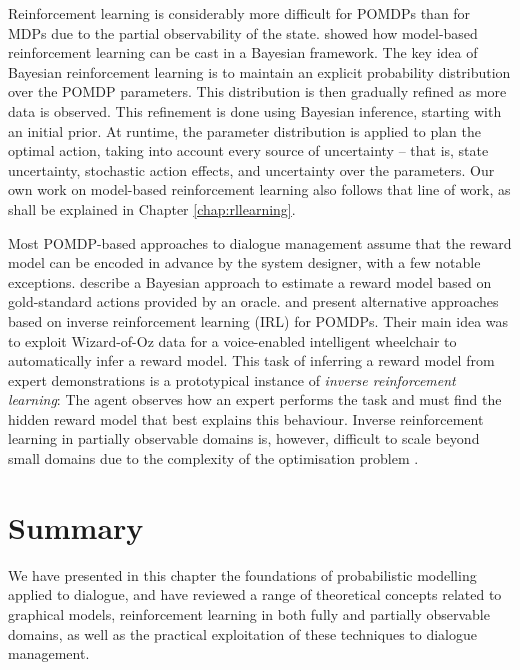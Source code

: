Reinforcement learning is considerably more difficult for POMDPs than for MDPs due to the partial observability of the state.  \cite{5946754} showed how model-based reinforcement learning can be cast in a Bayesian framework. The key idea of Bayesian reinforcement learning is to maintain an explicit probability distribution over the POMDP parameters. This distribution is then gradually refined as more data is observed. This refinement is done using Bayesian inference, starting with an initial prior.  At runtime, the parameter distribution is applied to plan the optimal action, taking into account every source of uncertainty -- that is, state uncertainty, stochastic action effects, and uncertainty over the parameters.  Our own work on model-based reinforcement learning also follows that line of work, as shall be explained in Chapter \ref{chap:rllearning}. 

Most POMDP-based approaches to dialogue management assume that the reward model can be encoded in advance by the system designer, with a few notable exceptions. \cite{DBLP:conf/iui/AtrashP09} describe a Bayesian approach to estimate a reward model based on gold-standard actions provided by an oracle. \cite{boularias2010} and \cite{ChinaeiC12} present alternative approaches based on inverse reinforcement learning (IRL) for POMDPs. Their main idea was to exploit Wizard-of-Oz data for a voice-enabled intelligent wheelchair to automatically infer a reward model.  This task of inferring a reward model from expert demonstrations is a prototypical instance of \textit{inverse reinforcement learning}: The agent observes how an expert performs the task and must find the hidden reward model that best explains this behaviour.  Inverse reinforcement learning in partially observable domains is, however, difficult to scale beyond small domains due to the complexity of the optimisation problem \citep{Choi:2011}. 

\section{Summary}

We have presented in this chapter the foundations of probabilistic modelling applied to dialogue, and have reviewed a range of theoretical concepts related to graphical models, reinforcement learning in both fully and partially observable domains, as well as the practical exploitation of these techniques to dialogue management. 


